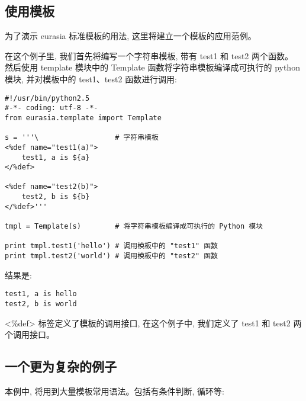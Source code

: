 \documentclass{manual}
\begin{document}
\subsection{使用模板}

为了演示 eurasia 标准模板的用法, 这里将建立一个模板的应用范例。

在这个例子里, 我们首先将编写一个字符串模板, 带有 test1 和 test2 两个函数。
然后使用 template 模块中的 Template 函数将字符串模板编译成可执行的 python 模块,
并对模板中的 test1、test2 函数进行调用:

\begin{verbatim}
#!/usr/bin/python2.5
#-*- coding: utf-8 -*-
from eurasia.template import Template

s = '''\                  # 字符串模板
<%def name="test1(a)">
	test1, a is ${a}
</%def>

<%def name="test2(b)">
	test2, b is ${b}
</%def>'''

tmpl = Template(s)        # 将字符串模板编译成可执行的 Python 模块

print tmpl.test1('hello') # 调用模板中的 "test1" 函数
print tmpl.test2('world') # 调用模板中的 "test2" 函数
\end{verbatim}

结果是:

\begin{verbatim}
test1, a is hello
test2, b is world
\end{verbatim}

<\%def> 标签定义了模板的调用接口, 在这个例子中, 我们定义了 test1 和 test2 两个调用接口。


\subsection{一个更为复杂的例子}

本例中, 将用到大量模板常用语法。包括有条件判断, 循环等:
\end{document}
